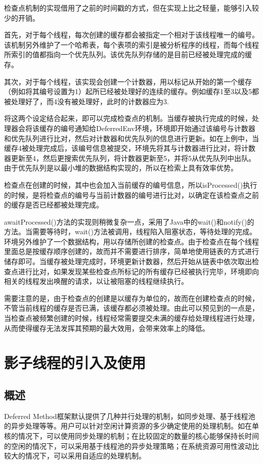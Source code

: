 检查点机制的实现借用了之前的时间戳的方式，但在实现上比之轻量，能够引入较少的开销。

首先，对于每个线程，每次创建的缓存都会被指定一个相对于该线程唯一的编号。该机制另外维护了一个哈希表，每个表项的索引是被分析程序的线程，而每个线程所索引的值都指向一个优先队列。该优先队列存储的是目前已经被处理完成的缓存。

其次，对于每个线程，该实现会创建一个计数器，用以标记从开始的第一个缓存（例如将其编号设置为1）起所已经被处理好的连续的缓存。例如缓存1至3以及5都被处理好了，而4没有被处理好，此时的计数器应为3.

将这两个设定结合起来，即可以完成检查点的机制。当缓存被执行完成的时候，处理器会将该缓存的编号通知给DeferredEnv环境，环境即开始通过该编号与计数器和优先队列进行比对，然后对计数器和优先队列的信息进行更新。如在上例中，当缓存4被处理完成后，该编号信息被提交，环境先将其与计数器进行比对，将计数器更新至4，然后更搜索优先队列，将计数器更新至5，并将5从优先队列中出队。由于优先队列是以最小堆的数据结构实现的，所以在检索上具有效率优势。

检查点在创建的时候，其中也会加入当前缓存的编号信息，所以isProcessed()执行的时候，是将检查点的编号与当前计数器的编号进行比对，以确定在该检查点之前的缓存是否已经都被处理完成。

awaitProcessed()方法的实现则稍微复杂一点，采用了Java中的wait()和notify()的方法。当需要等待时，wait()方法被调用，线程陷入阻塞状态，等待处理的完成。环境另外维护了一个数据结构，用以存储所创建的检查点。由于检查点在每个线程里面总是按缓存顺序创建的，故而并不需要进行排序，简单地使用链表的方式进行储存即可。当缓存被处理完成时，环境更新计数器，然后开始从链表中依次取出检查点进行比对，如果发现某些检查点所标记的所有缓存已经被执行完毕，环境即向相关的线程发出唤醒的请求，以让被阻塞的线程继续执行。

需要注意的是，由于检查点的创建是以缓存为单位的，故而在创建检查点的时候，不管当前线程的缓存是否已满，该缓存都必须被处理。由此可以预见到的一点是，当检查点被频繁创建的时候，线程经常需要提交未满的缓存给处理线程进行处理，从而使得缓存无法发挥其预期的最大效用，会带来效率上的降低。

\section{影子线程的引入及使用}

\subsection{概述}

Deferred Method框架默认提供了几种并行处理的机制，如同步处理、基于线程池的异步处理等等。用户可以针对空闲计算资源的多少确定使用的处理机制。如在单核的情况下，可以使用同步处理的机制；在比较固定的数量的核心能够保持长时间的空闲的情况下，可以采用基于线程池的异步处理策略；在系统资源可用性波动比较大的情况下，可以采用自适应的处理机制。

